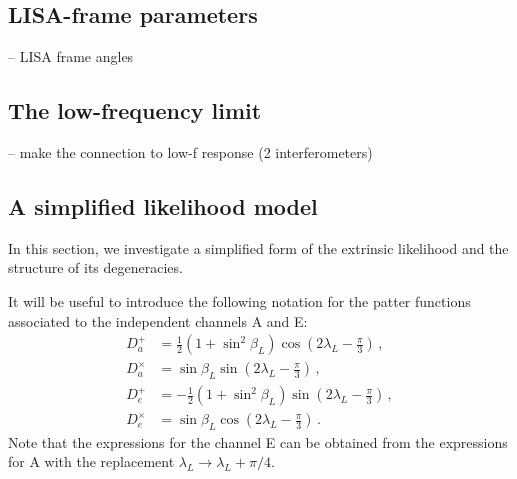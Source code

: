 \documentclass[aps,showpacs,twocolumn,prd,superscriptaddress,nofootinbib]{revtex4}
\newcommand{\bsub}{\begin{subequations}}
\newcommand{\esub}{\end{subequations}}
\newcommand\betaL{{\beta_{L}}}
\newcommand\lambdaL{{\lambda_{L}}}
\begin{document}
\subsection{LISA-frame parameters}
\label{sec:LISAframe}

-- LISA frame angles


\subsection{The low-frequency limit}
\label{sec:low-freq}

-- make the connection to low-f response (2 interferometers)


\subsection{A simplified likelihood model}
\label{sec:simple-like}

In this section, we investigate a simplified form of the extrinsic likelihood and the structure of its degeneracies.

It will be useful to introduce the following notation for the patter functions associated to the independent channels A and E:
\bsub\label{eq:defDaDe}
\begin{align}
	D_{a}^{+} &= \frac{1}{2} \left( 1 + \sin^{2}\betaL \right) \cos\left( 2\lambdaL - \frac{\pi}{3} \right) \,, \\
	D_{a}^{\times} &= \sin \betaL \sin\left( 2\lambdaL - \frac{\pi}{3} \right) \,, \\
	D_{e}^{+} &= - \frac{1}{2} \left( 1 + \sin^{2}\betaL \right) \sin\left( 2\lambdaL - \frac{\pi}{3} \right) \,, \\
	D_{e}^{\times} &= \sin \betaL \cos\left( 2\lambdaL - \frac{\pi}{3} \right) \,.
\end{align}
\esub
Note that the expressions for the channel E can be obtained from the expressions for A with the replacement $\lambdaL \rightarrow \lambdaL + \pi/4$.
\end{document}
